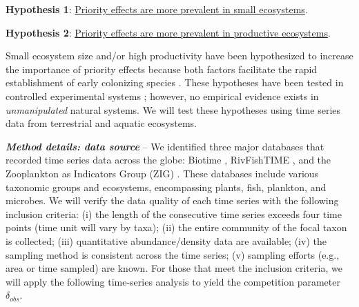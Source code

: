 \documentclass[12pt, class=article, crop=false]{standalone}
\begin{document}
\textbf{Hypothesis 1}: \ul{Priority effects are more prevalent in small ecosystems}.

\textbf{Hypothesis 2}: \ul{Priority effects are more prevalent in productive ecosystems}.

Small ecosystem size and/or high productivity have been hypothesized to increase the importance of priority effects because both factors facilitate the rapid establishment of early colonizing species \citep{fukami_historical_2015}.
These hypotheses have been tested in controlled experimental systems \citep{fukami_assembly_2004, chase_stochastic_2010}; however, no empirical evidence exists in \textit{unmanipulated} natural systems.
We will test these hypotheses using time series data from terrestrial and aquatic ecosystems.


\textit{\textbf{Method details: data source}} --
We identified three major databases that recorded time series data across the globe: Biotime \citep{dornelas_biotime_2018}, RivFishTIME \citep{comte_rivfishtime_2021}, and the Zooplankton as Indicators Group (ZIG) \citep{figary_building_2022}. 
These databases include various taxonomic groups and ecosystems, encompassing plants, fish, plankton, and microbes.
We will verify the data quality of each time series with the following inclusion criteria: (i) the length of the consecutive time series exceeds four time points (time unit will vary by taxa); (ii) the entire community of the focal taxon is collected; (iii) quantitative abundance/density data are available; (iv) the sampling method is consistent across the time series; (v) sampling efforts (e.g., area or time sampled) are known.
For those that meet the inclusion criteria, we will apply the following time-series analysis to yield the competition parameter $\delta_{obs}$.
\end{document}
